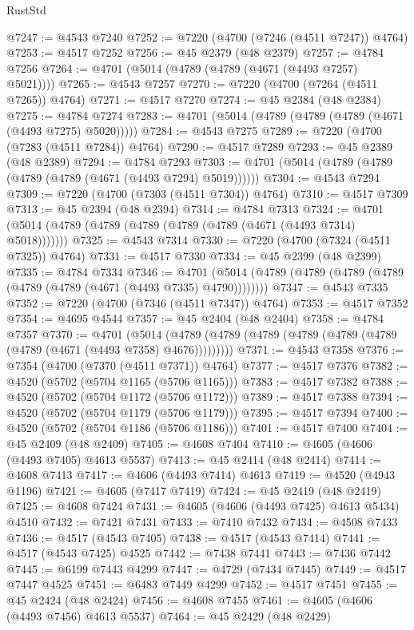 \begin{lexlean}{RustStd}
\begin{coremodule}
@7247 := @4543 @7240
@7252 := @7220 (@4700 (@7246 (@4511 @7247)) @4764)
@7253 := @4517 @7252
@7256 := @45 @2379 (@48 @2379)
@7257 := @4784 @7256
@7264 := @4701 (@5014 (@4789 (@4789 (@4671 (@4493 @7257) @5021))))
@7265 := @4543 @7257
@7270 := @7220 (@4700 (@7264 (@4511 @7265)) @4764)
@7271 := @4517 @7270
@7274 := @45 @2384 (@48 @2384)
@7275 := @4784 @7274
@7283 := @4701 (@5014 (@4789 (@4789 (@4789 (@4671 (@4493 @7275) @5020)))))
@7284 := @4543 @7275
@7289 := @7220 (@4700 (@7283 (@4511 @7284)) @4764)
@7290 := @4517 @7289
@7293 := @45 @2389 (@48 @2389)
@7294 := @4784 @7293
@7303 := @4701 (@5014 (@4789 (@4789 (@4789 (@4789 (@4671 (@4493 @7294) @5019))))))
@7304 := @4543 @7294
@7309 := @7220 (@4700 (@7303 (@4511 @7304)) @4764)
@7310 := @4517 @7309
@7313 := @45 @2394 (@48 @2394)
@7314 := @4784 @7313
@7324 := @4701 (@5014 (@4789 (@4789 (@4789 (@4789 (@4789 (@4671 (@4493 @7314) @5018)))))))
@7325 := @4543 @7314
@7330 := @7220 (@4700 (@7324 (@4511 @7325)) @4764)
@7331 := @4517 @7330
@7334 := @45 @2399 (@48 @2399)
@7335 := @4784 @7334
@7346 := @4701 (@5014 (@4789 (@4789 (@4789 (@4789 (@4789 (@4789 (@4671 (@4493 @7335) @4790))))))))
@7347 := @4543 @7335
@7352 := @7220 (@4700 (@7346 (@4511 @7347)) @4764)
@7353 := @4517 @7352
@7354 := @4695 @4544
@7357 := @45 @2404 (@48 @2404)
@7358 := @4784 @7357
@7370 := @4701
    (@5014 (@4789 (@4789 (@4789 (@4789 (@4789 (@4789 (@4789 (@4671 (@4493 @7358) @4676)))))))))
@7371 := @4543 @7358
@7376 := @7354 (@4700 (@7370 (@4511 @7371)) @4764)
@7377 := @4517 @7376
@7382 := @4520 (@5702 (@5704 @1165 (@5706 @1165)))
@7383 := @4517 @7382
@7388 := @4520 (@5702 (@5704 @1172 (@5706 @1172)))
@7389 := @4517 @7388
@7394 := @4520 (@5702 (@5704 @1179 (@5706 @1179)))
@7395 := @4517 @7394
@7400 := @4520 (@5702 (@5704 @1186 (@5706 @1186)))
@7401 := @4517 @7400
@7404 := @45 @2409 (@48 @2409)
@7405 := @4608 @7404
@7410 := @4605 (@4606 (@4493 @7405) @4613 @5537)
@7413 := @45 @2414 (@48 @2414)
@7414 := @4608 @7413
@7417 := @4606 (@4493 @7414) @4613
@7419 := @4520 (@4943 @1196)
@7421 := @4605 (@7417 @7419)
@7424 := @45 @2419 (@48 @2419)
@7425 := @4608 @7424
@7431 := @4605 (@4606 (@4493 @7425) @4613 @5434) @4510
@7432 := @7421 @7431
@7433 := @7410 @7432
@7434 := @4508 @7433
@7436 := @4517 (@4543 @7405)
@7438 := @4517 (@4543 @7414)
@7441 := @4517 (@4543 @7425) @4525
@7442 := @7438 @7441
@7443 := @7436 @7442
@7445 := @6199 @7443 @4299
@7447 := @4729 (@7434 @7445)
@7449 := @4517 @7447 @4525
@7451 := @6483 @7449 @4299
@7452 := @4517 @7451
@7455 := @45 @2424 (@48 @2424)
@7456 := @4608 @7455
@7461 := @4605 (@4606 (@4493 @7456) @4613 @5537)
@7464 := @45 @2429 (@48 @2429)

\end{coremodule}
\end{lexlean}
